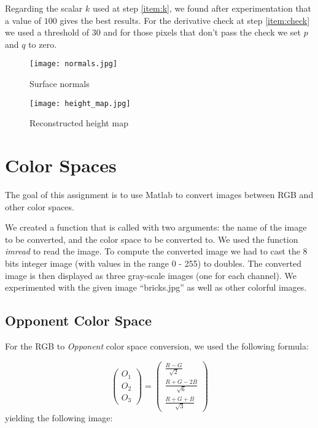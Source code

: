 \documentclass[11pt]{article}
\begin{document}
Regarding the scalar $k$ used at step \ref{item:k}, we found after experimentation that a value of $100$ gives the best results.
For the derivative check at step \ref{item:check} we used a threshold of $30$ and for those pixels that don't pass the check we set $p$ and $q$ to zero.


\begin{figure}[H]
    \centering
    \texttt{[image: normals.jpg]}
    \caption{Surface normals}
    \label{fig:normal_map}
\end{figure}

\begin{figure}[H]
    \centering
    \texttt{[image: height\_map.jpg]}
    \caption{Reconstructed height map}
    \label{fig:height_map}
\end{figure}


\section{Color Spaces}
The goal of this assignment is to use Matlab to convert images between RGB and other color spaces.

We created a function that is called with two arguments: the name of the image to be converted, and the color space to be converted to.
We used the function \textit{imread} to read the image.
To compute the converted image we had to cast the 8 bits integer image (with values in the range 0 - 255) to doubles.
The converted image is then displayed as three gray-scale images (one for each channel).
We experimented with the given image “bricks.jpg” as well as other colorful images.

\subsection{Opponent Color Space}
For the RGB to \textit{Opponent} color space conversion, we used the following formula:

$$
\begin{pmatrix}
	O_1 \\
	O_2 	\\
	O_3
\end{pmatrix} = 
\begin{pmatrix}
	\frac{R - G}{\sqrt{2}}			\\
	\frac{R + G - 2B}{\sqrt{6}}		\\
	\frac{R + G + B}{\sqrt{3}}
\end{pmatrix}
$$
yielding the following image:
\end{document}
